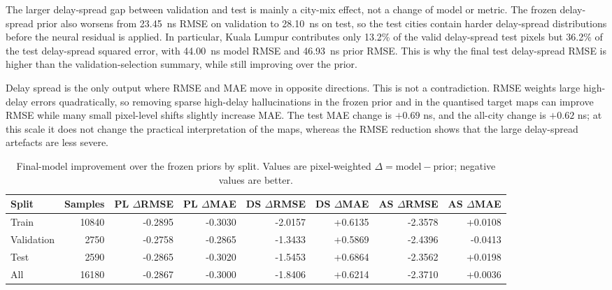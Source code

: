 The larger delay-spread gap between validation and test is mainly a city-mix
effect, not a change of model or metric. The frozen delay-spread prior
also worsens from \SI{23.45}{ns} RMSE on validation to \SI{28.10}{ns} on test,
so the test cities contain harder delay-spread distributions before the neural
residual is applied. In particular, Kuala Lumpur contributes only 13.2\% of
the valid delay-spread test pixels but 36.2\% of the test delay-spread squared
error, with \SI{44.00}{ns} model RMSE and \SI{46.93}{ns} prior RMSE. This is
why the final test delay-spread RMSE is higher than the validation-selection
summary, while still improving over the prior.

Delay spread is the only output where RMSE and MAE move in opposite directions.
This is not a contradiction. RMSE weights large high-delay errors
quadratically, so removing sparse high-delay hallucinations in the frozen prior
and in the quantised target maps can improve RMSE while many small pixel-level
shifts slightly increase MAE. The test MAE change is \(+0.69\) ns, and the
all-city change is \(+0.62\) ns; at this scale it does not change the practical
interpretation of the maps, whereas the RMSE reduction shows that the large
delay-spread artefacts are less severe.

\begin{table}[H]
\centering
\caption[Final-model improvement by split.]%
{Final-model improvement over the frozen priors by split. Values are
pixel-weighted \(\Delta=\mathrm{model}-\mathrm{prior}\); negative values are
better.}
\label{tab:try80_split_delta}
\scriptsize
\begin{tabular}{lrrrrrrr}
\toprule
Split & Samples & PL \(\Delta\)RMSE & PL \(\Delta\)MAE & DS \(\Delta\)RMSE & DS \(\Delta\)MAE & AS \(\Delta\)RMSE & AS \(\Delta\)MAE \\
\midrule
Train & 10840 & -0.2895 & -0.3030 & -2.0157 & +0.6135 & -2.3578 & +0.0108 \\
Validation & 2750 & -0.2758 & -0.2865 & -1.3433 & +0.5869 & -2.4396 & -0.0413 \\
Test & 2590 & -0.2865 & -0.3020 & -1.5453 & +0.6864 & -2.3562 & +0.0198 \\
All & 16180 & -0.2867 & -0.3000 & -1.8406 & +0.6214 & -2.3710 & +0.0036 \\
\bottomrule
\end{tabular}
\end{table}

